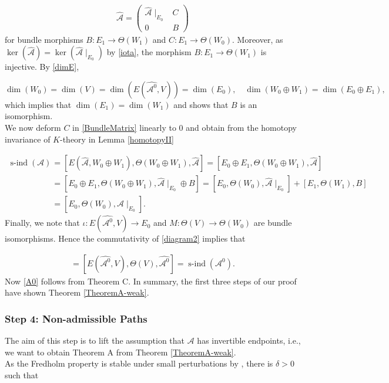 \documentclass[a4paper,10pt]{article}
\DeclareMathOperator{\sind}{s-ind}
\begin{document}
\begin{align}\label{BundleMatrix}
\hat{\mathcal{A}}=\begin{pmatrix}
\hat{\mathcal{A}}\mid_{E_0}&C\\
0&B
\end{pmatrix}
\end{align}
for bundle morphisms $B:E_1\rightarrow\Theta(W_1)$ and $C:E_1\rightarrow\Theta(W_0)$. Moreover, as $\ker(\hat{\mathcal{A}})=\ker(\hat{\mathcal{A}}\mid_{E_0})$ by \eqref{iota}, the morphism $B:E_1\rightarrow\Theta(W_1)$ is injective. By \eqref{dimE},

\[\dim(W_0)=\dim(V)=\dim(E(\hat{\mathcal{A}^0},V))=\dim(E_0),\quad \dim(W_0\oplus W_1)=\dim(E_0\oplus E_1),\]
which implies that $\dim(E_1)=\dim(W_1)$ and shows that $B$ is an isomorphism.\\
We now deform $C$ in \eqref{BundleMatrix} linearly to $0$ and obtain from the homotopy invariance of $K$-theory in Lemma \ref{homotopyII}

\begin{align*}
\sind(\mathcal{A})&=[E(\hat{\mathcal{A}},W_0\oplus W_1),\Theta(W_0\oplus W_1),\hat{\mathcal{A}}]=[E_0\oplus E_1,\Theta(W_0\oplus W_1),\hat{\mathcal{A}}]\\
&=[E_0\oplus E_1,\Theta(W_0\oplus W_1),\hat{\mathcal{A}}\mid_{E_0}\oplus B]=[E_0,\Theta(W_0),\hat{\mathcal{A}}\mid_{E_0}]+[E_1,\Theta(W_1),B]\\
&=[E_0,\Theta(W_0),\hat{\mathcal{A}}\mid_{E_0}].
\end{align*}
Finally, we note that $\iota:E(\hat{\mathcal{A}^0},V)\rightarrow E_0$ and $M:\Theta(V)\rightarrow\Theta(W_0)$ are bundle isomorphisms. Hence the commutativity of \eqref{diagram2} implies that 

\begin{align*}
[E_0,\Theta(W_0),\hat{\mathcal{A}}\mid_{E_0}]=[E(\hat{\mathcal{A}^0},V),\Theta(V),\hat{\mathcal{A}^0}]=\sind(\mathcal{A}^0).
\end{align*}
Now \eqref{A0} follows from Theorem C. In summary, the first three steps of our proof have shown Theorem \ref{TheoremA-weak}.



\subsubsection*{Step 4: Non-admissible Paths}
The aim of this step is to lift the assumption that $\mathcal{A}$ has invertible endpoints, i.e., we want to obtain Theorem A from Theorem \ref{TheoremA-weak}.\\
As the Fredholm property is stable under small perturbations by \cite[Thm. XVII.4.2]{Gohberg}, there is $\delta>0$ such that 
\end{document}
